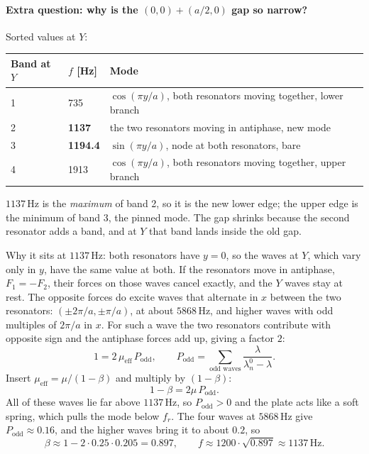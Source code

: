 \paragraph{Extra question: why is the $(0,0)+(a/2,0)$ gap so narrow?}
Sorted values at $Y$:
\begin{center}
\begin{tabular}{|l|l|p{}|}
\hline
Band at $Y$ & $f$ [Hz] & Mode \\
\hline
1 & 735 & $\cos(\pi y/a)$, both resonators moving together, lower branch \\
2 & \textbf{1137} & the two resonators moving in antiphase, new mode \\
3 & \textbf{1194.4} & $\sin(\pi y/a)$, node at both resonators, bare \\
4 & 1913 & $\cos(\pi y/a)$, both resonators moving together, upper branch \\
\hline
\end{tabular}
\end{center}
$1137\,\mathrm{Hz}$ is the \emph{maximum} of band 2, so it is the new lower edge;
the upper edge is the minimum of band 3, the pinned mode. The gap shrinks because
the second resonator adds a band, and at $Y$ that band lands inside the old gap.

Why it sits at $1137\,\mathrm{Hz}$: both resonators have $y = 0$, so the waves at
$Y$, which vary only in $y$, have the same value at both. If the resonators move
in antiphase, $F_1 = -F_2$, their forces on those waves cancel exactly, and the $Y$
waves stay at rest. The opposite forces do excite waves that alternate in $x$
between the two resonators: $(\pm 2\pi/a, \pm\pi/a)$, at about
$5868\,\mathrm{Hz}$, and higher waves with odd multiples of $2\pi/a$ in $x$. For
such a wave the two resonators contribute with opposite sign and the antiphase
forces add up, giving a factor $2$:
\begin{equation}
  1 = 2\,\mu_\mathrm{eff}\, P_\mathrm{odd},
  \qquad
  P_\mathrm{odd} = \sum_{\text{odd waves}} \frac{\lambda}{\lambda_n^0 - \lambda} .
\end{equation}
Insert $\mu_\mathrm{eff} = \mu/(1-\beta)$ and multiply by $(1-\beta)$:
\begin{equation}
  1 - \beta = 2\mu\, P_\mathrm{odd} .
\end{equation}
All of these waves lie far above $1137\,\mathrm{Hz}$, so $P_\mathrm{odd} > 0$ and
the plate acts like a soft spring, which pulls the mode below $f_r$. The four waves
at $5868\,\mathrm{Hz}$ give $P_\mathrm{odd} \approx 0.16$, and the higher waves
bring it to about $0.2$, so
\begin{equation}
  \beta \approx 1 - 2\cdot 0.25\cdot 0.205 = 0.897 ,
  \qquad
  f \approx 1200\cdot\sqrt{0.897} \approx 1137\,\mathrm{Hz}.
\end{equation}

